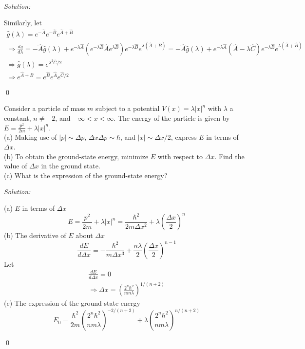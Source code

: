 \documentclass[12pt]{article}
\newenvironment{problem}[2][Problem]{\begin{trivlist}
\item[\hskip \labelsep {\bfseries #1}\hskip \labelsep {\bfseries #2.}]}{\end{trivlist}}
\newenvironment{sol}
    {\emph{Solution:}
    }
    {
    \qed
    }
\begin{document}
\begin{sol}
Similarly, let
\begin{gather}
\hat{g}(\lambda)=e^{-\hat{A}}e^{-\hat{B}}e^{\hat{A}+\hat{B}}\\
\Longrightarrow\frac{dg}{d\lambda}=-\hat{A}\hat{g}(\lambda)+e^{-\lambda\hat{A}}(e^{-\lambda\hat{B}}\hat{A}e^{\lambda\hat{B}})e^{-\lambda\hat{B}}e^{\lambda(\hat{A}+\hat{B})}=-\hat{A}\hat{g}(\lambda)+e^{-\lambda\hat{A}}(\hat{A}-\lambda\hat{C})e^{-\lambda\hat{B}}e^{\lambda(\hat{A}+\hat{B})}\\
\Longrightarrow\hat{g}(\lambda)=e^{\lambda^2\hat{C}/2}\\
\Longrightarrow e^{\hat{A}+\hat{B}}=e^{\hat{B}}e^{\hat{A}}e^{\hat{C}/2}
\end{gather}
\end{sol}

\begin{problem}{5}
Consider a particle of mass $m$ subject to a potential $V(x)=\lambda|x|^n$ with $\lambda$ a constant, $n\neq-2$, and $-\infty<x<\infty$. The energy of the particle is given by $E=\frac{p^2}{2m}+\lambda|x|^n$.\\
(a) Making use of $|p|\sim\Delta p$, $\Delta x\Delta p\sim\hbar$, and $|x|\sim\Delta x/2$, express $E$ in terms of $\Delta x$.\\
(b) To obtain the ground-state energy, minimize $E$ with respect to $\Delta x$. Find the value of $\Delta x$ in the ground state.\\
(c) What is the expression of the ground-state energy?
\end{problem}
\begin{sol}
(a) $E$ in terms of $\Delta x$
\begin{equation}
E=\frac{p^2}{2m}+\lambda|x|^n=\frac{\hbar^2}{2m\Delta x^2}+\lambda(\frac{\Delta x}{2})^n
\end{equation}
(b) The derivative of $E$ about $\Delta x$
\begin{equation}
\frac{d E}{d\Delta x}=-\frac{\hbar^2}{m\Delta x^3}+\frac{n\lambda}{2}(\frac{\Delta x}{2})^{n-1}
\end{equation}
Let
\begin{gather}
\frac{d E}{d\Delta x}=0\\
\Longrightarrow\Delta x=\left(\frac{2^n\hbar^2}{nm\lambda}\right)^{1/(n+2)}
\end{gather}
(c) The expression of the ground-state energy
\begin{equation}
E_0=\frac{\hbar^2}{2m}\left(\frac{2^n\hbar^2}{nm\lambda}\right)^{-2/(n+2)}+\lambda\left(\frac{2^n\hbar^2}{nm\lambda}\right)^{n/(n+2)}
\end{equation}
\end{sol}
\end{document}
